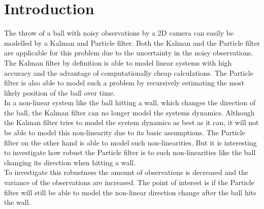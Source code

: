 \documentclass[conference]{IEEEtran}
\begin{document}
\section{Introduction}
The throw of a ball with noisy observations by a 2D camera can easily be modelled by a Kalman and Particle filter. 
Both the Kalman and the Particle filter are applicable for this problem due to the uncertainty in the noisy observations.
The Kalman filter by definition is able to model linear systems with high accuracy and the advantage of computationally cheap calculations. 
The Particle filter is also able to model such a problem by recursively estimating the most likely position of the ball over time. \\
In a non-linear system like the ball hitting a wall, which changes the direction of the ball, the Kalman filter can no longer model the systems dynamics.  
Although the Kalman filter tries to model the system dynamics as best as it can, it will not be able to model this non-linearity due to its basic assumptions. 
The Particle filter on the other hand is able to model such non-linearities. 
But it is interesting to investigate how robust the Particle filter is to such non-linearities like the ball changing its direction when hitting a wall. \\
To investigate this robustness the amount of observations is decreased and the variance of the observations are increased. 
The point of interest is if the Particle filter will still be able to model the non-linear direction change after the ball hits the wall.


\end{document}
